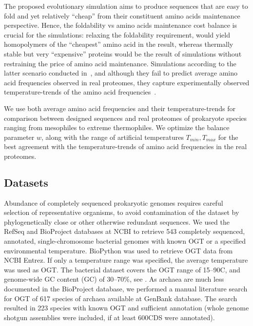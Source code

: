 \documentclass[10pt,letterpaper]{article}
\newcommand{\PROTEINLIMIT}{600}
\begin{document}
The proposed evolutionary simulation aims to produce sequences that are easy to fold and yet relatively ``cheap'' from their constituent amino acids maintenance perspective. Hence, the foldability vs amino acids maintenance cost balance is crucial for the simulations: relaxing the foldability requirement, would yield homopolymers of the ``cheapest'' amino acid in the result, whereas thermally stable but very ``expensive'' proteins would be the result of simulations without restraining the price of amino acid maintenance. Simulations according to the latter scenario conducted in~\cite{Berezovsky2007Positive}, and although they fail to predict average amino acid frequencies observed in real proteomes, they capture experimentally observed temperature-trends of the amino acid frequencies~\cite{Szilagyi2000Structural,Haney1999Thermal,Kumar2001How,Singer2003Thermophilic}. 

We use both average amino acid frequencies and their temperature-trends for comparison between designed sequences and real proteomes of prokaryote species ranging from mesophiles to extreme thermophiles. We optimize the balance parameter $\mathit{w}$, along with the range of artificial temperatures $T_{min},T_{max}$ for the best agreement with the temperature-trends of amino acid frequencies in the real proteomes.


\subsection*{Datasets}
Abundance of completely sequenced prokaryotic genomes requires careful selection of representative organisms, to avoid contamination of the dataset by phylogenetically close or other otherwise redundant sequences.
We used the RefSeq and BioProject databases at NCBI to retrieve 543 completely sequenced, annotated, single-chromosome bacterial genomes with known OGT or a specified environmental temperature. BioPython was used to retrieve OGT data from NCBI Entrez. If only a temperature range was specified, the average temperature was used as OGT. The bacterial dataset covers the OGT range of 15--90\textdegree C, and genome-wide GC content (GC) of 30--70\%, see .
As archaea are much less documented in the BioProject database, we performed a manual literature search for OGT of 617 species of archaea available at GenBank database. The search resulted in 223 species with known OGT and sufficient annotation (whole genome shotgun assemblies were included, if at least \PROTEINLIMIT CDS were annotated).
\end{document}
